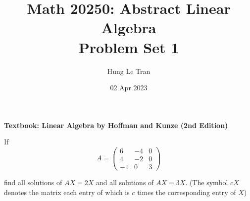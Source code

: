 \documentclass[a4paper, 10pt]{article}
\title{Math 20250: Abstract Linear Algebra \\ \large Problem Set 1}
\date{02 Apr 2023}
\author{Hung Le Tran}
\begin{document}
\maketitle
\newpage
\setcounter{section}{1}
\textbf{Textbook: Linear Algebra by Hoffman and Kunze (2nd Edition)}
\begin{problem} 
If \[
    A = \begin{pmatrix}
            6  & -4 & 0 \\
            4  & -2 & 0 \\
            -1 & 0  & 3
        \end{pmatrix}
\]

find all solutions of \(AX = 2X\) and all solutions of \(AX = 3X\). (The symbol \(cX\) denotes the matrix each entry of which is \(c\) times the corresponding entry of \(X\))
\end{problem}
\end{document}
